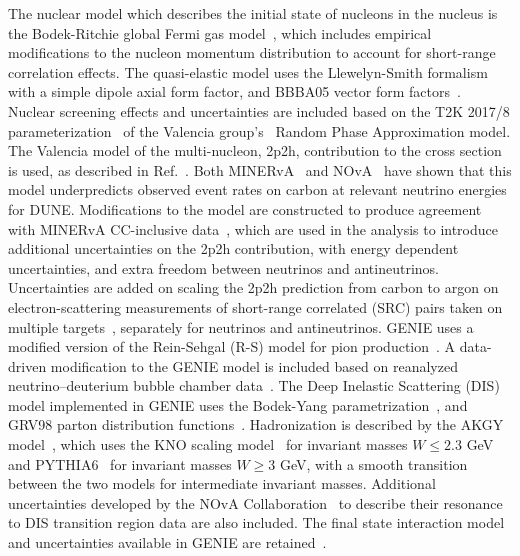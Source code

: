 The nuclear model which describes the initial state of nucleons in the nucleus is the Bodek-Ritchie global Fermi gas model~\cite{BodekRitchie}, which includes empirical modifications to the nucleon momentum distribution to account for short-range correlation effects. The quasi-elastic model uses the Llewelyn-Smith formalism~\cite{llewelyn-smith} with a simple dipole axial form factor, and BBBA05 vector form factors~\cite{bbba05}. Nuclear screening effects and uncertainties are included based on the T2K 2017/8 parameterization~\cite{Abe:2018wpn} of the Valencia group's~\cite{nieves1,nieves2} Random Phase Approximation model. The Valencia model of the multi-nucleon, 2p2h, contribution to the cross section~\cite{nieves1,nieves2} is used, as described in Ref.~\cite{Schwehr:2016pvn}. Both MINERvA~\cite{Rodrigues:2015hik} and NOvA~\cite{NOvA:2018gge} have shown that this model underpredicts observed event rates on carbon at relevant neutrino energies for DUNE. Modifications to the model are constructed to produce agreement with MINERvA CC-inclusive data~\cite{Rodrigues:2015hik}, which are used in the analysis to introduce additional uncertainties on the 2p2h contribution, with energy dependent uncertainties, and extra freedom between neutrinos and antineutrinos. Uncertainties are added on scaling the 2p2h prediction from carbon to argon on electron-scattering measurements of short-range correlated (SRC) pairs taken on multiple targets~\cite{Colle:2015ena}, separately for neutrinos and antineutrinos. GENIE uses a modified version of the Rein-Sehgal (R-S) model for pion production~\cite{Rein:1980wg}. A data-driven modification to the GENIE model is included based on reanalyzed neutrino--deuterium bubble chamber data~\cite{Wilkinson:2014yfa,Rodrigues:2016xjj}. The Deep Inelastic Scattering (DIS) model implemented in GENIE uses the Bodek-Yang parametrization~\cite{Bodek:2002ps}, and GRV98 parton distribution functions~\cite{Gluck:1998xa}. Hadronization is described by the AKGY model~\cite{Yang:2009zx}, which uses the KNO scaling model~\cite{Koba:1972ng} for invariant masses $W \leq 2.3$ GeV and PYTHIA6~\cite{Sjostrand:2006za} for invariant masses $W \geq 3$ GeV, with a smooth transition between the two models for intermediate invariant masses. Additional uncertainties developed by the NOvA Collaboration~\cite{nova_2018} to describe their resonance to DIS transition region data are also included. The final state interaction model and uncertainties available in GENIE are retained~\cite{Dytman:2011zz,Dytman:2015taa,intranuke_2009}.

